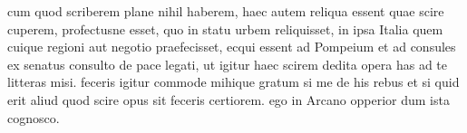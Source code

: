 


 cum quod scriberem plane nihil haberem, haec autem reliqua essent quae scire cuperem, profectusne esset, quo in statu urbem reliquisset, in ipsa Italia quem cuique regioni aut negotio praefecisset, ecqui essent ad Pompeium et ad consules ex senatus consulto de pace legati, ut igitur haec scirem dedita opera has ad te litteras misi. feceris igitur commode mihique gratum si me de his rebus et si quid erit aliud quod scire opus sit feceris certiorem. ego in Arcano opperior dum ista cognosco.
